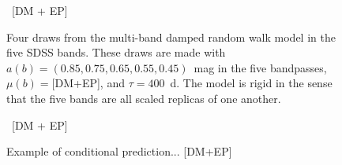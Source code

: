 \documentclass[letterpaper,12pt,preprint]{aastex}
\begin{document}
\begin{figure}
~[DM + EP]~
\caption{Four draws from the multi-band damped random walk model in
  the five SDSS bands.  These draws are made with $a(b)=(0.85, 0.75,
  0.65, 0.55, 0.45)$~mag in the five bandpasses, $\mu(b)=$[DM+EP], and
  $\tau=400$~d.  The model is rigid in the sense that the five bands
  are all scaled replicas of one another.\label{fig:mdraws}}
\end{figure}

\begin{figure}
~[DM + EP]~
\caption{Example of conditional
  prediction... [DM+EP]\label{fig:conditional}}
\end{figure}
\end{document}
